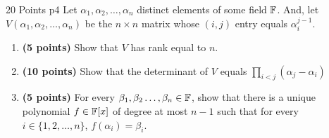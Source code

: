 \documentclass[a4paper, 11pt]{article}
\begin{document}
\begin{problem}{%
\hfill 20 Points
	}{p4%
	}
Let $\alpha_1,\alpha_2,\dots, \alpha_n$ distinct elements of some field $\mathbb{F}$. And, let $V(\alpha_1,\alpha_2,\dots, \alpha_n)$ be the $n\times n$ matrix whose $(i,j)$ entry equals $\alpha_i^{j-1}$.
\begin{enumerate}[label=(\alph*)]
\item \textbf{(5 points)} Show that $V$ has rank equal to $n$.
\item \textbf{(10 points)} Show that the determinant of $V$ equals $\prod\limits_{i<j}(\alpha_j-\alpha_i)$
\item \textbf{(5 points)} For every $\beta_1,\beta_2\dots, \beta_n\in \mathbb{F}$, show that there is a unique polynomial $f\in\mathbb{F}[x]$ of degree at most $n-1$ such that for every $i\in\{1,2,\dots, n\}$, $f(\alpha_i)=\beta_i$.
\end{enumerate}
\end{problem}
\end{document}
